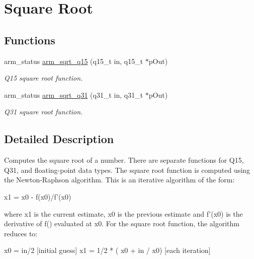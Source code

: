 \hypertarget{group___s_q_r_t}{\section{Square Root}
\label{group___s_q_r_t}
}
\subsection*{Functions}
\begin{DoxyCompactItemize}
\item 
arm\-\_\-status \hyperlink{group___s_q_r_t_ga5abe5ca724f3e15849662b03752c1238}{arm\-\_\-sqrt\-\_\-q15} (q15\-\_\-t in, q15\-\_\-t $\ast$p\-Out)
\begin{DoxyCompactList}\small\item\em Q15 square root function. \end{DoxyCompactList}\item 
arm\-\_\-status \hyperlink{group___s_q_r_t_ga119e25831e141d734d7ef10636670058}{arm\-\_\-sqrt\-\_\-q31} (q31\-\_\-t in, q31\-\_\-t $\ast$p\-Out)
\begin{DoxyCompactList}\small\item\em Q31 square root function. \end{DoxyCompactList}\end{DoxyCompactItemize}


\subsection{Detailed Description}
Computes the square root of a number. There are separate functions for Q15, Q31, and floating-\/point data types. The square root function is computed using the Newton-\/\-Raphson algorithm. This is an iterative algorithm of the form\-: 
\begin{DoxyPre}
     x1 = x0 - f(x0)/f'(x0)
\end{DoxyPre}
 where {\ttfamily x1} is the current estimate, {\ttfamily x0} is the previous estimate and {\ttfamily f'(x0)} is the derivative of {\ttfamily f()} evaluated at {\ttfamily x0}. For the square root function, the algorithm reduces to\-: 
\begin{DoxyPre}
    x0 = in/2                         [initial guess]
    x1 = 1/2 * ( x0 + in / x0)        [each iteration]
\end{DoxyPre}
 

